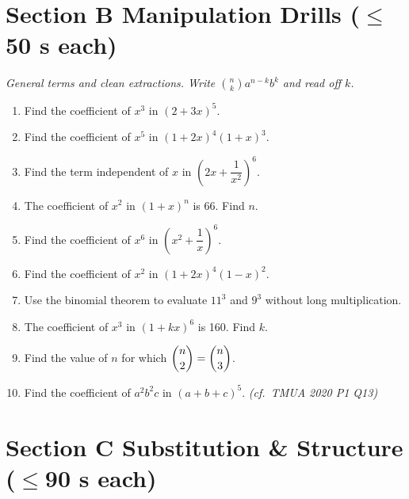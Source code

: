 \documentclass[11pt,a4paper]{article}
\begin{document}
\section*{Section B \quad Manipulation Drills \hfill{\normalfont\small($\leq$50 s each)}}

\noindent\textit{General terms and clean extractions. Write $\binom{n}{k}a^{n-k}b^k$ and read off $k$.}

\begin{enumerate}

\item Find the coefficient of $x^3$ in $(2+3x)^5$.

\item Find the coefficient of $x^5$ in $(1+2x)^4(1+x)^3$.

\item Find the term independent of $x$ in $\left(2x+\dfrac{1}{x^2}\right)^{6}$.

\item The coefficient of $x^2$ in $(1+x)^n$ is 66. Find $n$.

\item Find the coefficient of $x^6$ in $\left(x^2+\dfrac{1}{x}\right)^{6}$.

\item Find the coefficient of $x^2$ in $(1+2x)^4(1-x)^2$.

\item Use the binomial theorem to evaluate $11^3$ and $9^3$ without long multiplication.

\item The coefficient of $x^3$ in $(1+kx)^6$ is 160. Find $k$.

\item Find the value of $n$ for which $\dbinom{n}{2}=\dbinom{n}{3}$.

\item Find the coefficient of $a^2b^2c$ in $(a+b+c)^5$. \textit{\small(cf.\ TMUA 2020 P1 Q13)}

\end{enumerate}

\section*{Section C \quad Substitution \& Structure \hfill{\normalfont\small($\leq$90 s each)}}
\end{document}

